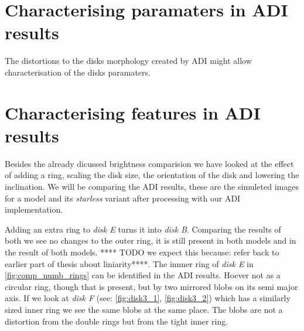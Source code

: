 \section{Characterising paramaters in ADI results}
The distortions to the disks morphology created by \ac{ADI} might allow characterisation of the disks paramaters.








\section{Characterising features in ADI results}

Besides the already dicussed brightness comparision we have looked at the effect of adding a ring, scaling the disk size, the orientation of the disk and lowering the inclination. We will be comparing the \ac{ADI} results, these are the simuleted images for a model and its \textit{starless} variant after processing with our \ac{ADI} implementation.

Adding an extra ring to \textit{disk E} turns it into \textit{disk B}. Comparing the results of both we see no changes to the outer ring, it is still present in both models and in the result of both models. **** TODO we expect this because: refer back to earlier part of thesis about liniarity****. The innner ring of \textit{disk E} in \autoref{fig:comp_numb_rings} can be identified in the \ac{ADI} results. Hoever not as a circular ring, though that is present, but by two mirrored blobs on its semi major axis. If we look at \textit{disk F} (see: \autoref{fig:disk3_1}, \autoref{fig:disk3_2}) which has a similarly sized inner ring we see the same blobs at the same place. The blobs are not a distortion from the double rings but from the tight inner ring. 

